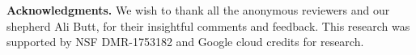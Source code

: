 

\noindent \textbf{Acknowledgments.} We wish to thank all the anonymous reviewers and our shepherd Ali Butt, for  their insightful comments and feedback.
This research was supported by NSF DMR-1753182 and Google cloud credits for research. 




